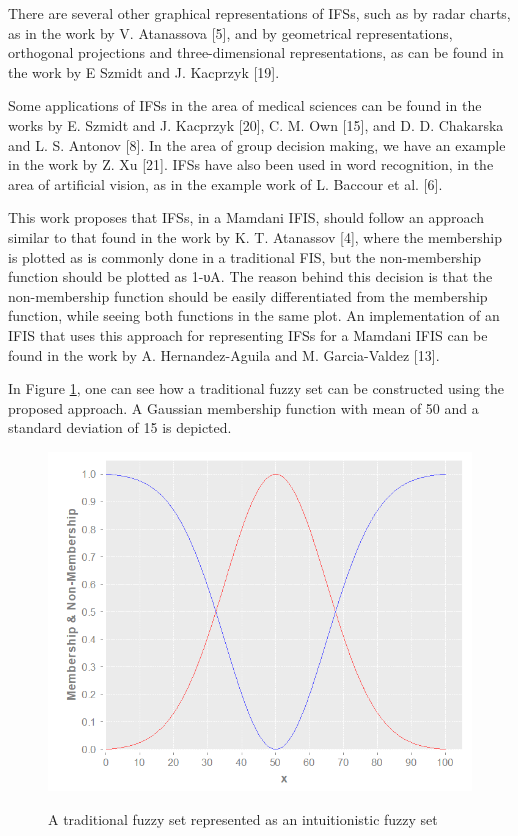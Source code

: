 There are several other graphical representations of IFSs, such as by radar charts, as in the work by V. Atanassova [5], and by geometrical representations, orthogonal projections and three-dimensional representations, as can be found in the work by E Szmidt and J. Kacprzyk [19].

Some applications of IFSs in the area of medical sciences can be found in the works by E. Szmidt and J. Kacprzyk [20],  C. M. Own [15], and D. D. Chakarska and L. S. Antonov [8]. In the area of group decision making, we have an example in the work by Z. Xu [21]. IFSs have also been used in word recognition, in the area of artificial vision, as in the example work of L. Baccour et al. [6].

This work proposes that IFSs, in a Mamdani IFIS, should follow an approach similar to that found in the work by K. T. Atanassov [4], where the membership is plotted as is commonly done in a traditional FIS, but the non-membership function should be plotted as 1-υA. The reason behind this decision is that the non-membership function should be easily differentiated from the membership function, while seeing both functions in the same plot. An implementation of an IFIS that uses this approach for representing IFSs for a Mamdani IFIS can be found in the work by A. Hernandez-Aguila and M. Garcia-Valdez [13].

In Figure \ref{figure:traditional-set-as-ifs}, one can see how a traditional fuzzy set can be constructed using the proposed approach. A Gaussian membership function with mean of 50 and a standard deviation of 15 is depicted.


\begin{figure}
\caption{A traditional fuzzy set represented as an intuitionistic fuzzy set}
\centering
\includegraphics[width=1.0\textwidth]{img/traditional-set-as-ifs.png}
\label{figure:traditional-set-as-ifs}
\end{figure}

